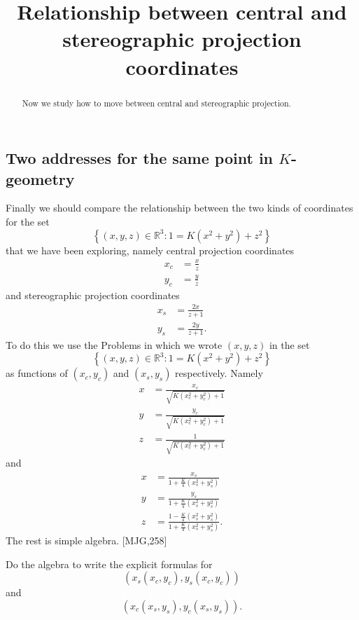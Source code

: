 \documentclass{ximera}
\title{Relationship between central and stereographic projection
  coordinates}
\begin{document}
\begin{abstract}
Now we study how to move between central and stereographic projection.
\end{abstract}
\maketitle


\subsection*{Two addresses for the same point in $K$-geometry}

Finally we should compare the relationship between the two kinds of
coordinates for the set%
\[
\left\{  \left(  x,y,z\right)  \in\mathbb{R}^{3}:1=K\left(  x^{2}%
+y^{2}\right)  +z^{2}\right\}
\]
that we have been exploring, namely central projection coordinates%
\begin{align*}
x_{c}  &  =\frac{x}{z}\\
y_{c}  &  =\frac{y}{z}
\end{align*}
and stereographic projection coordinates%
\begin{align*}
x_{s}  &  =\frac{2x}{z+1}\\
y_{s}  &  =\frac{2y}{z+1}.
\end{align*}
To do this we use the Problems in which we wrote $\left(  x,y,z\right)  $ in
the set
\[
\left\{ \left( x,y,z\right) \in\mathbb{R}^{3}:1=K\left( x^{2}%
+y^{2}\right) +z^{2}\right\}
\] 
as functions of $\left(x_{c},y_{c}\right)$ and
$\left(x_{s},y_{s}\right)$ respectively. Namely
\begin{align*}
x  &  =\frac{x_{c}}{\sqrt{K\left(  x_{c}^{2}+y_{c}^{2}\right)  +1}}\\
y  &  =\frac{y_{c}}{\sqrt{K\left(  x_{c}^{2}+y_{c}^{2}\right)  +1}}\\
z  &  =\frac{1}{\sqrt{K\left(  x_{c}^{2}+y_{c}^{2}\right)  +1}}%
\end{align*}
and%
\begin{align*}
x  &  =\frac{x_{s}}{1+\frac{K}{4}\left(  x_{s}^{2}+y_{s}^{2}\right)  }\\
y  &  =\frac{y_{s}}{1+\frac{K}{4}\left(  x_{s}^{2}+y_{s}^{2}\right)  }\\
z  &  =\frac{1-\frac{K}{4}\left(  x_{s}^{2}+y_{s}^{2}\right)  }{1+\frac{K}%
{4}\left(  x_{s}^{2}+y_{s}^{2}\right)  }.
\end{align*}
The rest is simple algebra. [MJG,258]

\begin{problem}
Do the algebra to write the explicit formulas for%
\[
\left(  x_{s}\left(  x_{c},y_{c}\right)  ,y_{s}\left(  x_{c},y_{c}\right)
\right)
\]
and%
\[
\left(  x_{c}\left(  x_{s},y_{s}\right)  ,y_{c}\left(  x_{s},y_{s}\right)
\right)  .
\]

\end{problem}
\end{document}
